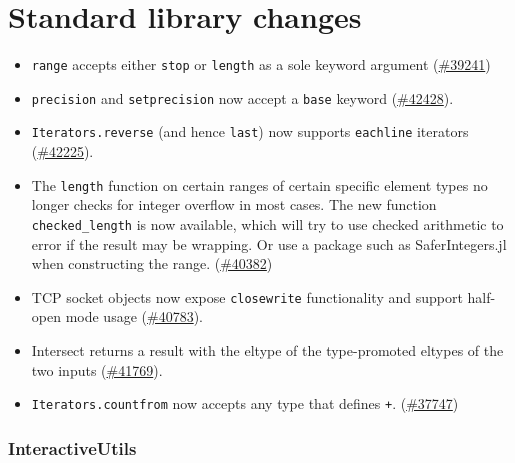 \hypertarget{10359018140604250447}{}


\chapter{Standard library changes}



\begin{itemize}
\item \texttt{range} accepts either \texttt{stop} or \texttt{length} as a sole keyword argument (\href{https://github.com/JuliaLang/julia/issues/39241}{\#39241})


\item \texttt{precision} and \texttt{setprecision} now accept a \texttt{base} keyword (\href{https://github.com/JuliaLang/julia/issues/42428}{\#42428}).


\item \texttt{Iterators.reverse} (and hence \texttt{last}) now supports \texttt{eachline} iterators (\href{https://github.com/JuliaLang/julia/issues/42225}{\#42225}).


\item The \texttt{length} function on certain ranges of certain specific element types no longer checks for integer overflow in most cases. The new function \texttt{checked\_length} is now available, which will try to use checked arithmetic to error if the result may be wrapping. Or use a package such as SaferIntegers.jl when constructing the range. (\href{https://github.com/JuliaLang/julia/issues/40382}{\#40382})


\item TCP socket objects now expose \texttt{closewrite} functionality and support half-open mode usage (\href{https://github.com/JuliaLang/julia/issues/40783}{\#40783}).


\item Intersect returns a result with the eltype of the type-promoted eltypes of the two inputs (\href{https://github.com/JuliaLang/julia/issues/41769}{\#41769}).


\item \texttt{Iterators.countfrom} now accepts any type that defines \texttt{+}. (\href{https://github.com/JuliaLang/julia/issues/37747}{\#37747})

\end{itemize}


\hypertarget{7540427318979651745}{}


\subsection{InteractiveUtils}



